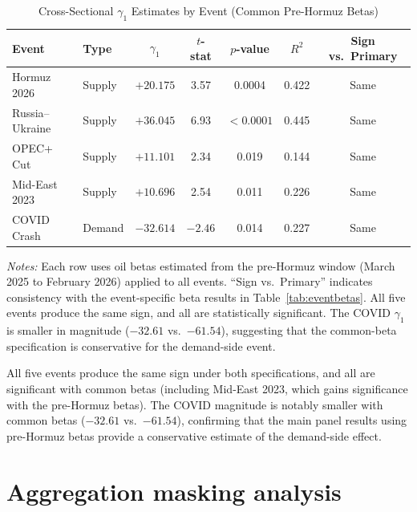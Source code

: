 \documentclass[12pt,preprint,authoryear]{elsarticle}
\begin{document}
\begin{table}[H]
\centering
\caption{Cross-Sectional $\gamma_1$ Estimates by Event (Common Pre-Hormuz Betas)}
\label{tab:events}
\begin{threeparttable}
\begin{tabular}{llccccc}
\toprule
Event & Type & $\gamma_1$ & $t$-stat & $p$-value & $R^2$ & Sign vs.\ Primary \\
\midrule
Hormuz 2026 & Supply & $+20.175$ & 3.57 & 0.0004 & 0.422 & Same \\
Russia--Ukraine & Supply & $+36.045$ & 6.93 & $<0.0001$ & 0.445 & Same \\
OPEC+ Cut & Supply & $+11.101$ & 2.34 & 0.019 & 0.144 & Same \\
Mid-East 2023 & Supply & $+10.696$ & 2.54 & 0.011 & 0.226 & Same \\
\midrule
COVID Crash & Demand & $-32.614$ & $-2.46$ & 0.014 & 0.227 & Same \\
\bottomrule
\end{tabular}
\begin{tablenotes}[flushleft]\footnotesize
\item \textit{Notes:} Each row uses oil betas estimated from the pre-Hormuz window (March 2025 to February 2026) applied to all events. ``Sign vs.\ Primary'' indicates consistency with the event-specific beta results in Table~\ref{tab:eventbetas}. All five events produce the same sign, and all are statistically significant. The COVID $\gamma_1$ is smaller in magnitude ($-32.61$ vs.\ $-61.54$), suggesting that the common-beta specification is conservative for the demand-side event.
\end{tablenotes}
\end{threeparttable}
\end{table}

All five events produce the same sign under both specifications, and all are significant with common betas (including Mid-East 2023, which gains significance with the pre-Hormuz betas). The COVID magnitude is notably smaller with common betas ($-32.61$ vs.\ $-61.54$), confirming that the main panel results using pre-Hormuz betas provide a conservative estimate of the demand-side effect.

\section{Aggregation masking analysis}\label{sec:masking}
\end{document}
